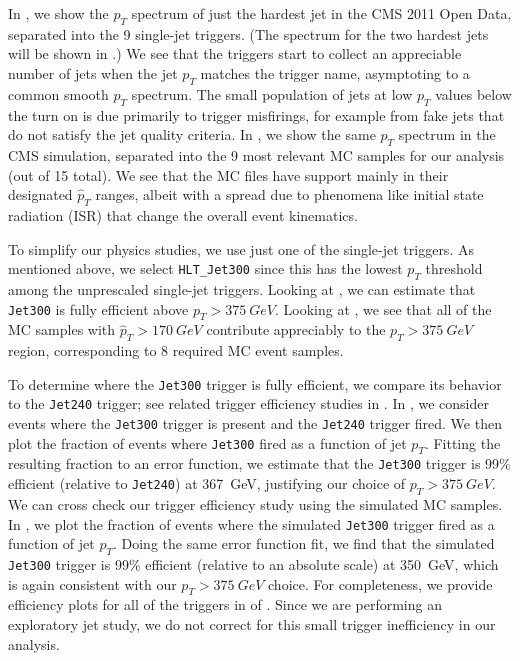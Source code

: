 \documentclass[aps,prd,twocolumn,preprintnumbers,nofootinbib,longbibliography,floatfix,superscriptaddress]{revtex4-1}
\begin{document}
In , we show the $p_T$ spectrum of just the hardest jet in the CMS 2011 Open Data, separated into the 9 single-jet triggers.
%
(The spectrum for the two hardest jets will be shown in .)
%
We see that the triggers start to collect an appreciable number of jets when the jet $p_T$ matches the trigger name, asymptoting to a common smooth $p_T$ spectrum. 
%
The small population of jets at low $p_T$ values below the turn on is due primarily to trigger misfirings, for example from fake jets that do not satisfy the jet quality criteria.
%
In , we show the same $p_T$ spectrum in the CMS simulation, separated into the 9 most relevant MC samples for our analysis (out of 15 total).
%
We see that the MC files have support mainly in their designated $\hat{p}_T$ ranges, albeit with a spread due to phenomena like initial state radiation (ISR) that change the overall event kinematics.


To simplify our physics studies, we use just one of the single-jet triggers.
%
As mentioned above, we select \texttt{HLT\_Jet300} since this has the lowest $p_T$ threshold among the unprescaled single-jet triggers.
%
Looking at , we can estimate that \texttt{Jet300} is fully efficient above $p_T > \SI{375}{GeV}$.
%
Looking at , we see that all of the MC samples with $\hat{p}_T > \SI{170}{GeV}$ contribute appreciably to the $p_T > \SI{375}{GeV}$ region, corresponding to 8 required MC event samples.


To determine where the \texttt{Jet300} trigger is fully efficient, we compare its behavior to the \texttt{Jet240} trigger; see related trigger efficiency studies in .
%
In , we consider events where the \texttt{Jet300} trigger is present and the \texttt{Jet240} trigger fired.
%
We then plot the fraction of events where \texttt{Jet300} fired as a function of jet $p_T$.
%
Fitting the resulting fraction to an error function, we estimate that the \texttt{Jet300} trigger is 99\% efficient (relative to \texttt{Jet240}) at \SI{367}{GeV}, justifying our choice of $p_T > \SI{375}{GeV}$.
%
We can cross check our trigger efficiency study using the simulated MC samples.
%
In , we plot the fraction of events where the simulated  \texttt{Jet300} trigger fired as a function of jet $p_T$.
%
Doing the same error function fit, we find that the simulated  \texttt{Jet300} trigger is 99\% efficient (relative to an absolute scale) at \SI{350}{GeV}, which is again consistent with our $p_T > \SI{375}{GeV}$ choice.
%
For completeness, we provide efficiency plots for all of the triggers in  of .
%
Since we are performing an exploratory jet study, we do not correct for this small trigger inefficiency in our analysis.
\end{document}
